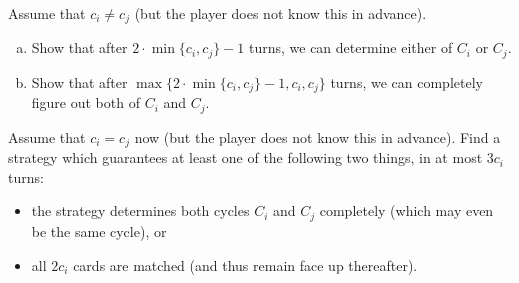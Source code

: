 \documentclass[10pt]{article}
\newif\ifpaper
\begin{document}
\begin{problem}
    [6 points]
    Assume that $c_i\neq c_j$
    (but the player does not know this in advance).
    \begin{enumerate}[(a)]
        \item Show that after $2\cdot\min\{c_i,c_j\}-1$ turns,
        we can determine either of $C_i$ or $C_j$.
        \item Show that after $\max\{2\cdot\min\{c_i,c_j\}-1,c_i,c_j\}$ turns,
    we can completely figure out both of $C_i$ and $C_j$.
    \end{enumerate}
\end{problem}

\ifpaper
\begin{tcolorbox}
    The signal argument succeeds in at most this time,
    and by this time, we can read the repeats in the shorter cycle.

\end{tcolorbox}
\fi

\begin{problem}
    [8 points]
    Assume that $c_i=c_j$ now (but the player does not know this in advance).
    Find a strategy which guarantees at least one of the following two things,
    in at most $3c_i$ turns:
    \begin{itemize}
        \item the strategy determines both cycles $C_i$ and $C_j$ completely
        (which may even be the same cycle), or
        \item all $2c_i$ cards are matched (and thus remain face up thereafter).
    \end{itemize}
\end{problem}
\end{document}
